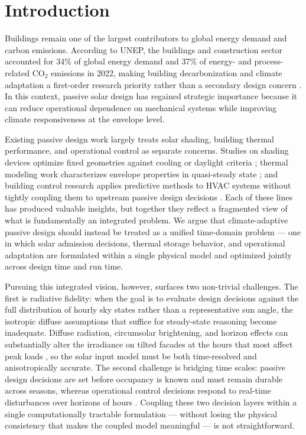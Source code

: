 \documentclass[preprint,12pt]{elsarticle}
\begin{document}
\linenumbers

\section{Introduction}
\label{sec:introduction}

Buildings remain one of the largest contributors to global energy demand and carbon emissions. According to UNEP, the buildings and construction sector accounted for 34\% of global energy demand and 37\% of energy- and process-related CO$_2$ emissions in 2022, making building decarbonization and climate adaptation a first-order research priority rather than a secondary design concern \cite{unep2024}. In this context, passive solar design has regained strategic importance because it can reduce operational dependence on mechanical systems while improving climate responsiveness at the envelope level.

Existing passive design work largely treats solar shading, building thermal performance, and operational control as separate concerns. Studies on shading devices optimize fixed geometries against cooling or daylight criteria \cite{kirimtat2016,valladares2014,nazari2023}; thermal modeling work characterizes envelope properties in quasi-steady state \cite{verbeke2018,yang2024,lauster2014}; and building control research applies predictive methods to HVAC systems without tightly coupling them to upstream passive design decisions \cite{drgona2020,zhan2021}. Each of these lines has produced valuable insights, but together they reflect a fragmented view of what is fundamentally an integrated problem. We argue that climate-adaptive passive design should instead be treated as a unified time-domain problem --- one in which solar admission decisions, thermal storage behavior, and operational adaptation are formulated within a single physical model and optimized jointly across design time and run time.

Pursuing this integrated vision, however, surfaces two non-trivial challenges. The first is radiative fidelity: when the goal is to evaluate design decisions against the full distribution of hourly sky states rather than a representative sun angle, the isotropic diffuse assumptions that suffice for steady-state reasoning become inadequate. Diffuse radiation, circumsolar brightening, and horizon effects can substantially alter the irradiance on tilted facades at the hours that most affect peak loads \cite{perez1990}, so the solar input model must be both time-resolved and anisotropically accurate. The second challenge is bridging time scales: passive design decisions are set before occupancy is known and must remain durable across seasons, whereas operational control decisions respond to real-time disturbances over horizons of hours \cite{goncalves2024,hong2023,ismail2023}. Coupling these two decision layers within a single computationally tractable formulation --- without losing the physical consistency that makes the coupled model meaningful --- is not straightforward.
\end{document}
